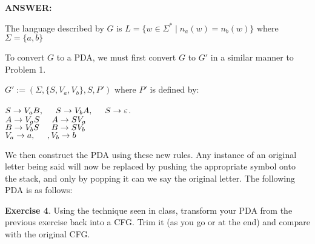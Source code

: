 \documentclass{article}
\begin{document}
\textbf{ANSWER:}

The language described by $G$ is $L = \{w\in\Sigma^* \mid n_a(w) = n_b(w)\}$ where $\Sigma = \{a, b\}$

To convert $G$ to a PDA, we must first convert $G$ to $G'$ in a similar manner to Problem 1. 

$G' := (\Sigma, \{S, V_a, V_b\}, S, P')$ where $P'$ is defined by:

\begin{center}
	$S \rightarrow V_aB, \hspace{0.5cm} S \rightarrow V_bA, \hspace{0.5cm} S \rightarrow \varepsilon$.\\
	$A \rightarrow V_aS \hspace{0.5cm} A \rightarrow SV_a$ \\
	$B \rightarrow V_bS \hspace{0.5cm} B\rightarrow SV_b$ \\
	$V_a \rightarrow a, \hspace{0.5cm}, V_b \rightarrow b$ \\
\end{center}

We then construct the PDA using these new rules. Any instance of an original letter being said will now be replaced by pushing the appropriate symbol onto the stack, and only by popping it can we say the original letter. The following PDA is as follows:

\begin{center}
\end{center}


\textbf{Exercise 4}. Using the technique seen in class, transform your PDA from
the previous exercise back into a CFG. Trim it (as you go or at the end) and
compare with the original CFG.\\
\end{document}
